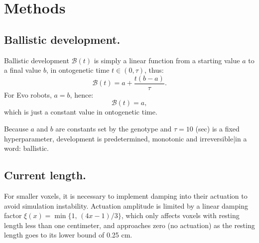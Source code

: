 
\section{Methods}
\label{sec4:methods}


\subsection*{Ballistic development.}

Ballistic development 
$\mathcal{B}(t)$
is simply a linear function from a starting value $a$ to a final value $b$, in ontogenetic time $t\in(0,\tau)$, thus: 
\begin{equation}
\label{eq4:ballistic-devo}
\mathcal{B}(t) = a + \frac{t(b-a)}{\tau}.
\end{equation}
For Evo robots, $a=b$, hence:
\begin{equation}
\label{eq4:no-devo}
\mathcal{B}(t) = a,
\end{equation}
which is just a constant value in ontogenetic time.

Because $a$ and $b$ are constants set by the genotype and $\tau=10$ (sec) is a fixed hyperparameter, development is predetermined, monotonic and irreversible|in a word: ballistic.



\subsection*{Current length.} 

For smaller voxels, it is necessary to implement damping into their actuation to avoid simulation instability. 
Actuation amplitude is limited by a linear damping factor $\xi(x) = \min\{1,\, (4x-1)/3\}$, which only affects voxels with resting length less than one centimeter, and approaches zero (no actuation) as the resting length goes to its lower bound of 0.25 cm.

